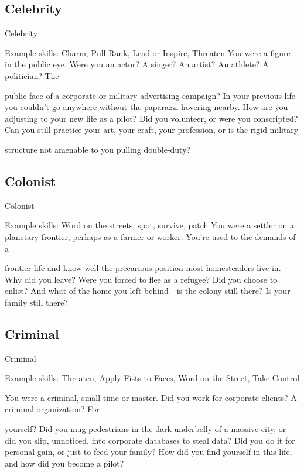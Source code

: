 \subsection{Celebrity}
                                                    Celebrity

Example skills: Charm, Pull Rank, Lead or Inspire, Threaten
You were a figure in the public eye. Were you an actor? A singer? An artist? An athlete? A politician? The

public face of a corporate or military advertising campaign? In your previous life you couldn’t go anywhere
without the paparazzi hovering nearby. How are you adjusting to your new life as a pilot? Did you volunteer,
or were you conscripted? Can you still practice your art, your craft, your profession, or is the rigid military

structure not amenable to you pulling double-duty?

\subsection{Colonist}
                                                    Colonist

Example skills: Word on the streets, spot, survive, patch
You were a settler on a planetary frontier, perhaps as a farmer or worker. You’re used to the demands of a

frontier life and know well the precarious position most homesteaders live in. Why did you leave? Were you
forced to flee as a refugee? Did you choose to enlist? And what of the home you left behind - is the colony
still there? Is your family still there?

\subsection{Criminal}
                                                    Criminal

Example skills: Threaten, Apply Fists to Faces, Word on the Street, Take Control

You were a criminal, small time or master. Did you work for corporate clients? A criminal organization? For

yourself? Did you mug pedestrians in the dark underbelly of a massive city, or did you slip, unnoticed, into
corporate databases to steal data? Did you do it for personal gain, or just to feed your family? How did you
find yourself in this life, and how did you become a pilot?

